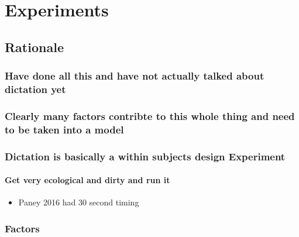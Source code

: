 \documentclass[]{book}
\providecommand{\tightlist}{%
  \setlength{\itemsep}{0pt}\setlength{\parskip}{0pt}}
\theoremstyle{definition}
\theoremstyle{definition}
\theoremstyle{definition}
\theoremstyle{remark}
\begin{document}
\hypertarget{experiments}{%
\chapter{Experiments}\label{experiments}}

\hypertarget{rationale}{%
\section{Rationale}\label{rationale}}

\hypertarget{have-done-all-this-and-have-not-actually-talked-about-dictation-yet}{%
\subsection{Have done all this and have not actually talked about
dictation
yet}\label{have-done-all-this-and-have-not-actually-talked-about-dictation-yet}}

\hypertarget{clearly-many-factors-contribte-to-this-whole-thing-and-need-to-be-taken-into-a-model}{%
\subsection{Clearly many factors contribte to this whole thing and need
to be taken into a
model}\label{clearly-many-factors-contribte-to-this-whole-thing-and-need-to-be-taken-into-a-model}}

\hypertarget{dictation-is-basically-a-within-subjects-design-experiment}{%
\subsection{Dictation is basically a within subjects design
Experiment}\label{dictation-is-basically-a-within-subjects-design-experiment}}

\hypertarget{get-very-ecological-and-dirty-and-run-it}{%
\subsubsection{Get very ecological and dirty and run
it}\label{get-very-ecological-and-dirty-and-run-it}}

\begin{itemize}
\tightlist
\item
  Paney 2016 had 30 second timing
\end{itemize}

\hypertarget{factors}{%
\subsection{Factors}\label{factors}}
\end{document}
